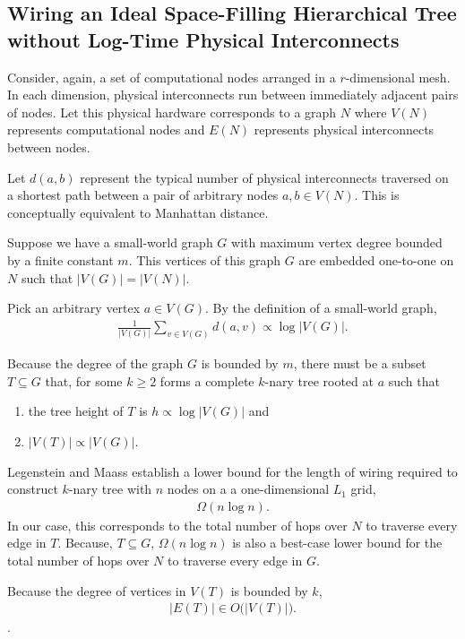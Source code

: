 \subsection{Wiring an Ideal Space-Filling Hierarchical Tree without Log-Time Physical Interconnects} \label{sec:proof2}

Consider, again, a set of computational nodes arranged in a $r$-dimensional mesh.
In each dimension, physical interconnects run between immediately adjacent pairs of nodes.
Let this physical hardware corresponds to a graph $N$ where $V(N)$ represents computational nodes and $E(N)$ represents physical interconnects between nodes.

Let $d(a,b)$ represent the typical number of physical interconnects traversed on a shortest path between a pair of arbitrary nodes $a, b \in V(N)$.
This is conceptually equivalent to Manhattan distance.

Suppose we have a small-world graph $G$ with maximum vertex degree bounded by a finite constant $m$.
This vertices of this graph $G$ are embedded one-to-one on $N$ such that $|V(G)| = |V(N)|$.

Pick an arbitrary vertex $a \in V(G)$.
By the definition of a small-world graph,
\begin{align*}
  \frac{1}{|V(G)|} \sum_{v \in V(G)} d(a, v) \propto \log |V(G)|.
\end{align*}

Because the degree of the graph $G$ is bounded by $m$, there must be a subset $T \subseteq G$ that, for some $k \geq 2$ forms a complete $k$-nary tree rooted at $a$ such that
\begin{enumerate}
  \item the tree height of $T$ is $h \propto \log |V(G)|$ and
  \item $|V(T)| \propto |V(G)|$.
\end{enumerate}

Legenstein and Maass \citep{legenstein2001optimizing} establish a lower bound for the length of wiring required to construct $k$-nary tree with $n$ nodes on a a one-dimensional $L_1$ grid,
\begin{align*}
\Omega(n \log n).
\end{align*}
In our case, this corresponds to the total number of hops over $N$ to traverse every edge in $T$.
Because, $T \subseteq G$, $\Omega(n \log n)$ is also a best-case lower bound for the total number of hops over $N$ to traverse every edge in $G$.

Because the degree of vertices in $V(T)$ is bounded by $k$,
\begin{align*}
|E(T)| \in O \Big( |V(T)| \Big).
\end{align*}.

